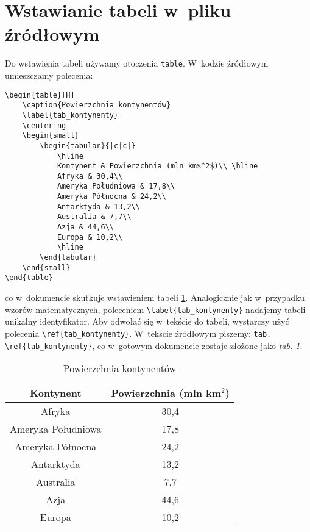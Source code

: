 \section{Wstawianie tabeli w~pliku źródłowym}
Do wstawienia tabeli używamy otoczenia \verb|table|. W~kodzie źródłowym umieszczamy polecenia:
\begin{lstlisting}[style=customlatex,frame=single]
\begin{table}[H]
	\caption{Powierzchnia kontynentów}
	\label{tab_kontynenty}
	\centering
	\begin{small}
		\begin{tabular}{|c|c|}
			\hline
			Kontynent & Powierzchnia (mln km$^2$)\\ \hline
			Afryka & 30,4\\
			Ameryka Południowa & 17,8\\
			Ameryka Północna & 24,2\\
			Antarktyda & 13,2\\
			Australia & 7,7\\
			Azja & 44,6\\
			Europa & 10,2\\
			\hline
		\end{tabular}
	\end{small}
\end{table}
\end{lstlisting}
co w~dokumencie skutkuje wstawieniem tabeli \ref{tab_kontynenty}. Analogicznie jak w~przypadku wzorów matematycznych, poleceniem \verb|\label{tab_kontynenty}| nadajemy tabeli unikalny identyfikator. Aby odwołać się w~tekście do tabeli, wystarczy użyć polecenia \verb|\ref{tab_kontynenty}|. W~tekście źródłowym piszemy: \verb|tab. \ref{tab_kontynenty}|, co w~gotowym dokumencie zostaje złożone jako \emph{tab. \ref{tab_kontynenty}}.

\begin{table}[H]
	\caption{Powierzchnia kontynentów}
	\label{tab_kontynenty}
	\centering
	\begin{small}
		\begin{tabular}{|c|c|}
			\hline
			Kontynent & Powierzchnia (mln km$^2$)\\ \hline
			Afryka & 30,4\\
			Ameryka Południowa & 17,8\\
			Ameryka Północna & 24,2\\
			Antarktyda & 13,2\\
			Australia & 7,7\\
			Azja & 44,6\\
			Europa & 10,2\\
			\hline
		\end{tabular}
	\end{small}
\end{table}

